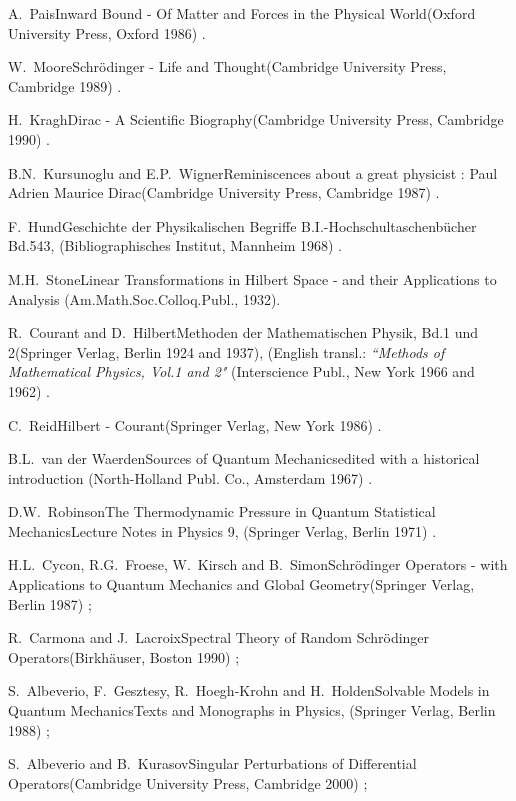 \documentclass[12pt]{report}
\begin{document}
\begin{thebibliography}{22}
 
\bookref
{A.~Pais}{Inward Bound - Of Matter and Forces in the Physical
World}{(Oxford University Press, Oxford 1986) .}

 
\bookref
{W.~Moore}{Schr\"odinger - Life and Thought}{(Cambridge 
University Press, Cambridge 1989) .}

 
\bookref
{H.~Kragh}{Dirac - A Scientific Biography}{(Cambridge 
University Press, Cambridge 1990) .}


\bookref
{B.N.~Kursunoglu and E.P.~Wigner}{Reminiscences about a great 
physicist : Paul Adrien Maurice Dirac}{(Cambridge 
University Press, Cambridge 1987) .}
 

\bookref
{F.~Hund}{Geschichte der Physikalischen Begriffe}{
B.I.-Hochschultaschen\-b\"ucher Bd.543, (Bibliographisches
Institut, Mannheim 1968) .}


\bookref
{M.H.~Stone}{Linear Transformations in Hilbert Space
- and their Applications to Analysis}{
(Am.Math.Soc.Colloq.Publ., 1932).} 


\bookref
{R.~Courant and D.~Hilbert}{Methoden der Mathematischen Physik,
Bd.1 und 2}{(Springer Verlag, Berlin 1924 and 1937), (English
transl.: {\it ``Methods of Mathematical Physics, Vol.1 and 2"}
(Interscience Publ., New York 1966 and 1962) .}

 
\bookref
{C.~Reid}{Hilbert - Courant}{(Springer Verlag, New York 1986) .}


\bookref
{B.L.~van der Waerden}{Sources of Quantum Mechanics}{edited with
a historical introduction (North-Holland Publ. Co., Amsterdam 1967) .}

 
\bookref
{D.W.~Robinson}{The Thermodynamic Pressure in Quantum Statistical
Mechanics}{Lecture Notes in Physics 9,
(Springer Verlag, Berlin 1971) .}

 
\bookref
{H.L.~Cycon, R.G.~Froese, W.~Kirsch and B.~Simon}{Schr\"odinger
Ope\-rators - with Applications to Quantum Mechanics and Global
Geometry}{(Springer Verlag, Berlin 1987) ;}
 
\bookref
{R.~Carmona and J.~Lacroix}{Spectral Theory of Random Schr\"odinger
Operators}{(Birkh\"auser, Boston 1990) ;}
 
\bookref
{S.~Albeverio, F.~Gesztesy, R.~Hoegh-Krohn and H.~Holden}{Sol\-vable
Models in Quantum Mechanics}{Texts and Monographs in Physics,
(Springer Verlag, Berlin 1988) ;}

\bookref
{S.~Albeverio  and B.~Kurasov}{Singular Perturbations of 
Differential 
Operators}{(Cambridge University Press, Cambridge 2000) ;}


\end{thebibliography}
\end{document}
